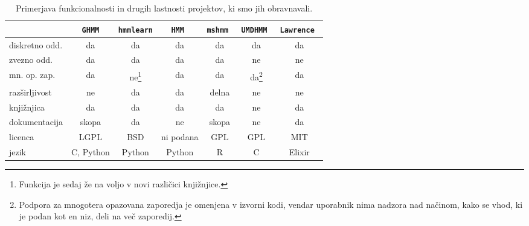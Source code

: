 \begin{table}
\begin{minipage}{\textwidth}
\centering
\small
\begin{tabular}{l|c|c|c|c|c|c}
& {\tt GHMM} & {\tt hmmlearn} & \tt{HMM} & \tt{mshmm} & \tt{UMDHMM} & \tt{Lawrence} \\ \hline
diskretno odd. & da & da & da & da & da & da \\ 
zvezno odd.    & da & da & da & da & ne & ne  \\
mn. op. zap.   & da & ne\footnote{Funkcija je sedaj že na voljo v novi različici knjižnjice.}
                        & da & da & da\footnote{Podpora za mnogotera opazovana zaporedja je omenjena v izvorni kodi, vendar uporabnik nima nadzora nad načinom, kako se vhod, ki je podan kot en niz, deli na več zaporedij.}
                                           & da \\
razširljivost  & ne & da & da & delna & ne & ne \\
knjižnjica  & da & da & da & da & ne & da \\
dokumentacija  & skopa & da & ne & skopa & ne & da \\
licenca        & LGPL & BSD & ni podana & GPL & GPL & MIT \\
jezik          & C, Python & Python & Python & R & C & Elixir \\
\end{tabular}
\caption[Pirmerjava funkcionalnosti projektov]{
  Primerjava funkcionalnosti in drugih lastnosti projektov, ki smo jih
  obravnavali.}
\label{tab:compare}
\end{minipage}
\end{table}
